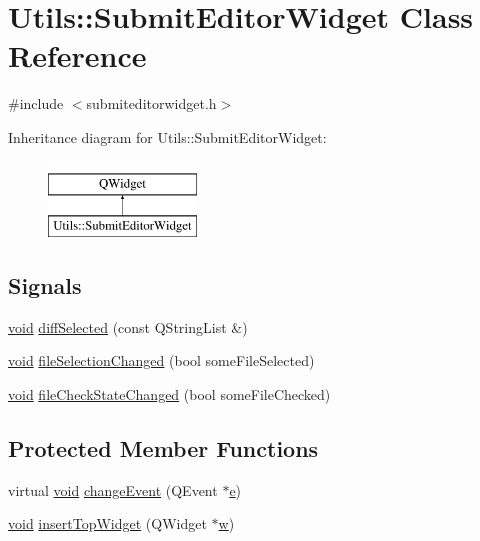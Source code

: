 \hypertarget{class_utils_1_1_submit_editor_widget}{\section{Utils\-:\-:Submit\-Editor\-Widget Class Reference}
\label{class_utils_1_1_submit_editor_widget}
}


{\ttfamily \#include $<$submiteditorwidget.\-h$>$}

Inheritance diagram for Utils\-:\-:Submit\-Editor\-Widget\-:\begin{figure}[H]
\begin{center}
\leavevmode
\includegraphics[height=2.000000cm]{class_utils_1_1_submit_editor_widget}
\end{center}
\end{figure}
\subsection*{Signals}
\begin{DoxyCompactItemize}
\item 
\hyperlink{group___u_a_v_objects_plugin_ga444cf2ff3f0ecbe028adce838d373f5c}{void} \hyperlink{class_utils_1_1_submit_editor_widget_a8c3e8a241b0d248a3f544bef7964b0a5}{diff\-Selected} (const Q\-String\-List \&)
\item 
\hyperlink{group___u_a_v_objects_plugin_ga444cf2ff3f0ecbe028adce838d373f5c}{void} \hyperlink{class_utils_1_1_submit_editor_widget_a08d39ccc85ccd77758b294635ff1f2b9}{file\-Selection\-Changed} (bool some\-File\-Selected)
\item 
\hyperlink{group___u_a_v_objects_plugin_ga444cf2ff3f0ecbe028adce838d373f5c}{void} \hyperlink{class_utils_1_1_submit_editor_widget_a162b229c57c72d8e16c834439991d208}{file\-Check\-State\-Changed} (bool some\-File\-Checked)
\end{DoxyCompactItemize}
\subsection*{Protected Member Functions}
\begin{DoxyCompactItemize}
\item 
virtual \hyperlink{group___u_a_v_objects_plugin_ga444cf2ff3f0ecbe028adce838d373f5c}{void} \hyperlink{class_utils_1_1_submit_editor_widget_a40268b62d83007572788f9071d0f4082}{change\-Event} (Q\-Event $\ast$\hyperlink{_o_p_plots_8m_a9425be9aab51621e317ba7ade564b570}{e})
\item 
\hyperlink{group___u_a_v_objects_plugin_ga444cf2ff3f0ecbe028adce838d373f5c}{void} \hyperlink{class_utils_1_1_submit_editor_widget_aed676670fabd92bf7fe3f71a7e441185}{insert\-Top\-Widget} (Q\-Widget $\ast$\hyperlink{glext_8h_ac1795f3b2fee217274b85c2750e1a889}{w})
\end{DoxyCompactItemize}


